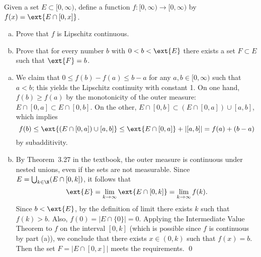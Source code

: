 \begin{hwsol}
Given a set $E \subset [0, \infty)$, define a function $f: [0, \infty) \to [0, \infty)$ by $f(x) = \ext{E \cap [0, x]}$. 
	\begin{enumerate}[(a)]
	\item Prove that $f$ is Lipschitz continuous.
	\item Prove that for every number $b$ with $0<b<\ext{E}$ there exists a set $F \subset E$ such that $\ext{F}= b$. \\
	\end{enumerate}

\pf \hfill
\begin{enumerate}[(a)]
\item We claim that $0 \leq f(b)-f(a) \leq b-a$ for any $a,b \in [0, \infty)$ such that $a<b$; this yields the Lipschitz continuity with constant 1. On one hand, $f(b) \geq f(a)$ by the monotonicity of the outer measure: $E \cap [0, a] \subset E \cap [0, b]$. On the other, $ E \cap [0, b] \subset ( E \cap [0, a] ) \cup [a, b]$, which implies
	\[
	f(b) \leq \ext{(E \cap [0, a] ) \cup [a, b]} \leq \ext{E\cap [0, a]} + |[a, b]| = f(a) + (b-a)
	\]
by subadditivity. 

\item By Theorem~3.27 in the textbook, the outer measure is continuous under nested unions, even if the sets are not measurable. Since $E= \bigcup_{k \in \N} (E \cap [0, k])$, it follows that
        \[
        \ext{E}= \lim_{k \to \infty} \ext{E \cap [0, k]}= \lim_{k \to \infty} f(k).
        \]
Since $b< \ext{E}$, by the definition of limit there exists $k$ such that $f(k)>b$. Also, $f(0)= |E \cap \{0\} | = 0$. Applying the Intermediate Value Theorem to $f$ on the interval $[0, k]$ (which is possible since $f$ is continuous by part (a)), we conclude that there exists $x \in (0, k)$ such that $f(x)=b$. Then the set $F= | E\cap [0, x] |$ meets the requirements. \qed \\
\end{enumerate}
\end{hwsol}



